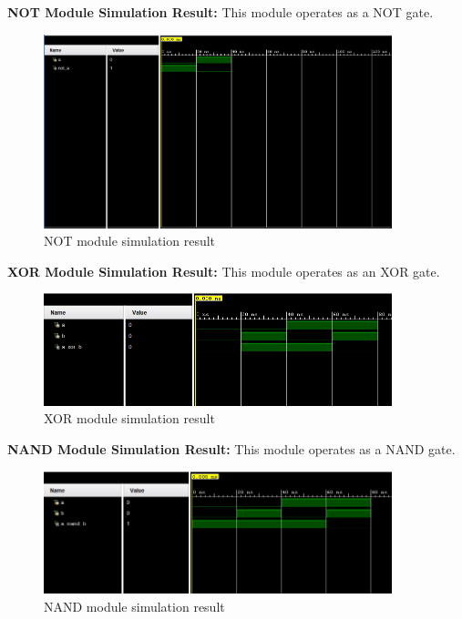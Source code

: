 \documentclass[pdftex,12pt,a4paper]{article}
\begin{document}
\begin{itemize}
   \textbf{NOT Module Simulation Result:} This module operates as a NOT gate.
    \begin{figure}[H]
    \centering
        \includegraphics[width=0.9\textwidth]{NOT.png}	
        \caption{NOT module simulation result}
        \label{fig1}
   \end{figure}
\newpage
   \textbf{XOR Module Simulation Result:} This module operates as an XOR gate.
    \begin{figure}[H]
    \centering
        \includegraphics[width=0.9\textwidth]{XOR.png}	
        \caption{XOR module simulation result}
        \label{fig1}
   \end{figure}

   \textbf{NAND Module Simulation Result:} This module operates as a NAND gate.
    \begin{figure}[H]
    \centering
        \includegraphics[width=0.9\textwidth]{NAND.png}	
        \caption{NAND module simulation result}
        \label{fig1}
   \end{figure}


\end{itemize}
\end{document}
